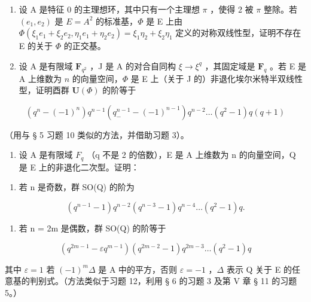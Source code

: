 \begin{enumerate}
\def\labelenumi{\arabic{enumi})}
\setcounter{enumi}{10}
\item
  设 A 是特征 0 的主理想环，其中只有一个主理想 \(\pi\) ，使得 2 被 \(\pi\) 整除。若 \((e_1, e_2)\) 是 \(E = A^2\) 的标准基，\(\Phi\) 是 E 上由 \(\Phi(\xi_1 e_1 + \xi_2 e_2, \eta_1 e_1 + \eta_2 e_2) = \xi_1 \eta_2 + \xi_2 \eta_1\) 定义的对称双线性型，证明不存在 E 的关于 \(\Phi\) 的正交基。
\item
  设 A 是有限域 \(\mathbf{F}_{q^{2}}\) ，J 是 A 的对合自同构 \(\xi \to \xi^{q}\) ，其固定域是 \(\mathbf{F}_{q}\) 。若 E 是 A 上维数为 \(n\) 的向量空间，\(\Phi\) 是 E 上（关于 J 的）非退化埃尔米特半双线性型，证明酉群 \(\mathbf{U}(\Phi)\) 的阶等于
\end{enumerate}

\[
(q ^ {n} - (- 1) ^ {n}) q ^ {n - 1} (q _ {-} ^ {n - 1} - (- 1) ^ {n - 1}) q ^ {n - 2} \dots (q ^ {2} - 1) q (q + 1)
\]

（用与 § 5 习题 10 类似的方法，并借助习题 3）。

\begin{enumerate}
\def\labelenumi{\arabic{enumi})}
\setcounter{enumi}{12}
\tightlist
\item
  设 A 是有限域 \(F_{q}\) （q 不是 2 的倍数），E 是 A 上维数为 n 的向量空间，Q 是 E 上的非退化二次型。证明：
\end{enumerate}

\begin{enumerate}
\def\labelenumi{\alph{enumi})}
\tightlist
\item
  若 n 是奇数，群 SO(Q) 的阶为
\end{enumerate}

\[
(q ^ {n - 1} - 1) q ^ {n - 2} (q ^ {n - 3} - 1) q ^ {n - 4} \dots (q ^ {2} - 1) q.
\]

\begin{enumerate}
\def\labelenumi{\alph{enumi})}
\setcounter{enumi}{1}
\tightlist
\item
  若 n = 2m 是偶数，群 SO(Q) 的阶等于
\end{enumerate}

\[
(q ^ {2 m - 1} - \varepsilon q ^ {m - 1}) (q ^ {2 m - 2} - 1) q ^ {2 m - 3} \dots (q ^ {2} - 1) q
\]

其中 \(\varepsilon = 1\) 若 \((-1)^{m}\Delta\) 是 A 中的平方，否则 \(\varepsilon = -1\) ，\(\Delta\) 表示 Q 关于 E 的任意基的判别式。（方法类似于习题 12，利用 § 6 的习题 3 及第 V 章 § 11 的习题 5。）

